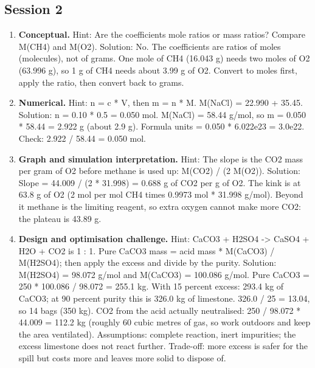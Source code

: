 \documentclass[11pt,a4paper]{article}
\begin{document}
\subsection*{Session 2}
\begin{enumerate}[nosep]
\item \textbf{Conceptual.} Hint: Are the coefficients mole ratios or mass ratios? Compare M(CH4) and M(O2). Solution: No. The coefficients are ratios of moles (molecules), not of grams. One mole of CH4 (16.043 g) needs two moles of O2 (63.996 g), so 1 g of CH4 needs about 3.99 g of O2. Convert to moles first, apply the ratio, then convert back to grams.
\item \textbf{Numerical.} Hint: n = c * V, then m = n * M. M(NaCl) = 22.990 + 35.45. Solution: n = 0.10 * 0.5 = 0.050 mol. M(NaCl) = 58.44 g/mol, so m = 0.050 * 58.44 = 2.922 g (about 2.9 g). Formula units = 0.050 * 6.022e23 = 3.0e22. Check: 2.922 / 58.44 = 0.050 mol.
\item \textbf{Graph and simulation interpretation.} Hint: The slope is the CO2 mass per gram of O2 before methane is used up: M(CO2) / (2 M(O2)). Solution: Slope = 44.009 / (2 * 31.998) = 0.688 g of CO2 per g of O2. The kink is at 63.8 g of O2 (2 mol per mol CH4 times 0.9973 mol * 31.998 g/mol). Beyond it methane is the limiting reagent, so extra oxygen cannot make more CO2: the plateau is 43.89 g.
\item \textbf{Design and optimisation challenge.} Hint: CaCO3 + H2SO4 -\textgreater{} CaSO4 + H2O + CO2 is 1 : 1. Pure CaCO3 mass = acid mass * M(CaCO3) / M(H2SO4); then apply the excess and divide by the purity. Solution: M(H2SO4) = 98.072 g/mol and M(CaCO3) = 100.086 g/mol. Pure CaCO3 = 250 * 100.086 / 98.072 = 255.1 kg. With 15 percent excess: 293.4 kg of CaCO3; at 90 percent purity this is 326.0 kg of limestone. 326.0 / 25 = 13.04, so 14 bags (350 kg). CO2 from the acid actually neutralised: 250 / 98.072 * 44.009 = 112.2 kg (roughly 60 cubic metres of gas, so work outdoors and keep the area ventilated). Assumptions: complete reaction, inert impurities; the excess limestone does not react further. Trade-off: more excess is safer for the spill but costs more and leaves more solid to dispose of.
\end{enumerate}
\end{document}
